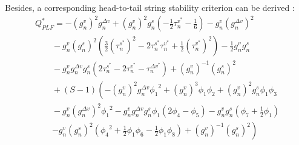 \documentclass[journal]{IEEEtran}
\begin{document}
Besides, a corresponding head-to-tail string stability criterion can be derived \citep{ngoduy2013analytical,2009Heterogeneity}:
\begin{equation}
  \begin{array}{l}
    Q_{PLF}^* =  - {\left( {g_n^v} \right)^2}g_n^{\Delta v} + {\left( {g_n^v} \right)^2}g_n^s\left( { - \frac{1}{2}\tau _n^{{v^*}} - \frac{1}{6}} \right) - g_n^v{\left( {g_n^{\Delta v}} \right)^2}                               \\
    \quad \quad  - g_n^v{\left( {g_n^s} \right)^2}\left( {\frac{3}{2}{{\left( {\tau _n^{{s^*}}} \right)}^2} - 2\tau _n^{{s^*}}\tau _n^{{v^*}} + \frac{1}{2}{{\left( {\tau _n^{{v^*}}} \right)}^2}} \right) - \frac{1}{2}g_n^vg_n^s \\
    \quad \quad  - g_n^vg_n^{\Delta v}g_n^s\left( {2\tau _n^{{s^*}} - 2\tau _n^{{v^*}} - \tau _n^{\Delta {v^*}}} \right) + {\left( {g_n^v} \right)^{ - 1}}{\left( {g_n^s} \right)^2}                                               \\
    \quad \quad  + \left( {S - 1} \right)\left( { - {{\left( {g_n^v} \right)}^2}g_n^{\Delta v}{\phi _1}^2 + {{\left( {g_n^v} \right)}^3}{\phi _1}{\phi _2} + {{\left( {g_n^v} \right)}^2}g_n^s{\phi _1}{\phi _3}} \right.          \\
    \quad \quad  - g_n^v{\left( {g_n^{\Delta v}} \right)^2}{\phi _1}^2 - g_n^vg_n^{\Delta v}g_n^s{\phi _1}\left( {2{\phi _4} - {\phi _5}} \right) - g_n^vg_n^s\left( {{\phi _7} + \frac{1}{2}{\phi _1}} \right)                    \\
    \quad \quad \left. { - g_n^v{{\left( {g_n^s} \right)}^2}\left( {{\phi _4}^2 + \frac{1}{2}{\phi _1}{\phi _6} - \frac{1}{2}{\phi _1}{\phi _8}} \right) + {{\left( {g_n^v} \right)}^{ - 1}}{{\left( {g_n^s} \right)}^2}} \right)
  \end{array}
\end{equation}
\end{document}
